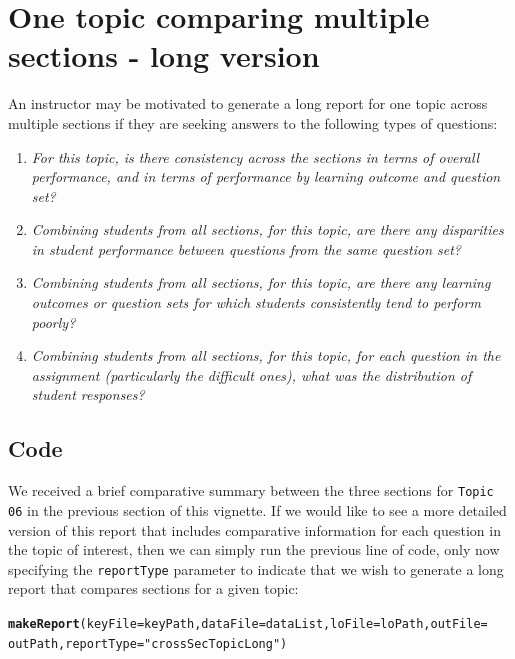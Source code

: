 \documentclass[11pt,a4paper,oldfontcommands,openany]{memoir}
\makeatletter
\newcommand{\hlstr}[1]{\textcolor[rgb]{0.192,0.494,0.8}{#1}}%
\newcommand{\hlstd}[1]{\textcolor[rgb]{0.345,0.345,0.345}{#1}}%
\newcommand{\hlkwc}[1]{\textcolor[rgb]{0.333,0.667,0.333}{#1}}%
\newcommand{\hlkwd}[1]{\textcolor[rgb]{0.737,0.353,0.396}{\textbf{#1}}}%
\newenvironment{kframe}{%
 \def\at@end@of@kframe{}%
 \ifinner\ifhmode%
  \def\at@end@of@kframe{\end{minipage}}%
  \begin{minipage}{\columnwidth}%
 \fi\fi%
 \def\FrameCommand##1{\hskip\@totalleftmargin \hskip-\fboxsep
 \colorbox{shadecolor}{##1}\hskip-\fboxsep
     \hskip-\linewidth \hskip-\@totalleftmargin \hskip\columnwidth}%
 \MakeFramed {\advance\hsize-\width
   \@totalleftmargin\z@ \linewidth\hsize
   \@setminipage}}%
 {\par\unskip\endMakeFramed%
 \at@end@of@kframe}
\newenvironment{knitrout}{}{} %
\numberwithin{equation}{section} %
\makeatother
\begin{document}
\section{One topic comparing multiple sections - long version}

An instructor may be motivated to generate a long report for one topic across multiple sections if they are seeking answers to the following types of questions:

\begin{enumerate}
\item \textit{For this topic, is there consistency across the sections in terms of overall performance, and in terms of performance by learning outcome and question set?}
\item \textit{Combining students from all sections, for this topic, are there any disparities in student performance between questions from the same question set?}
\item \textit{Combining students from all sections, for this topic, are there any learning outcomes or question sets for which students consistently tend to perform poorly?}
\item \textit{Combining students from all sections, for this topic, for each question in the assignment (particularly the difficult ones), what was the distribution of student responses?}
\end{enumerate}

\subsection{Code}

We received a brief comparative summary between the three sections for \texttt{Topic 06} in the previous section of this vignette. If we would like to see a more detailed version of this report that includes comparative information for each question in the topic of interest, then we can simply run the previous line of code, only now specifying the \texttt{reportType} parameter to indicate that we wish to generate a long report that compares sections for a given topic: \\

\begin{knitrout}
\color{fgcolor}\begin{kframe}
\begin{alltt}
\hlkwd{makeReport}\hlstd{(}\hlkwc{keyFile} \hlstd{= keyPath,} \hlkwc{dataFile} \hlstd{= dataList,} \hlkwc{loFile} \hlstd{= loPath,} \hlkwc{outFile} \hlstd{=}
  \hlstd{outPath,} \hlkwc{reportType} \hlstd{=} \hlstr{"crossSecTopicLong"}\hlstd{)}
\end{alltt}
\end{kframe}
\end{knitrout}
\end{document}
